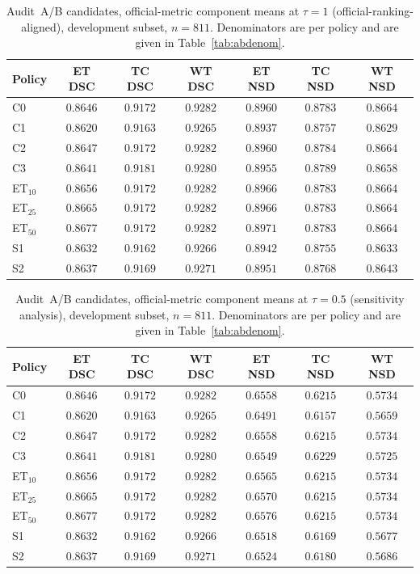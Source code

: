 \documentclass[runningheads]{llncs}
\begin{document}
\begin{table}[!htbp]\centering\small
\caption{Audit~A/B candidates, official-metric component means at $\tau=1$ (official-ranking-aligned), development subset, $n=811$. Denominators are per policy and are given in Table~\ref{tab:abdenom}.}
\begin{tabular}{@{}lcccccc@{}}
\toprule
Policy & ET DSC & TC DSC & WT DSC & ET NSD & TC NSD & WT NSD \\
\midrule
C0 & $0.8646$ & $0.9172$ & $0.9282$ & $0.8960$ & $0.8783$ & $0.8664$ \\
\midrule
C1 & $0.8620$ & $0.9163$ & $0.9265$ & $0.8937$ & $0.8757$ & $0.8629$ \\
C2 & $0.8647$ & $0.9172$ & $0.9282$ & $0.8960$ & $0.8784$ & $0.8664$ \\
C3 & $0.8641$ & $0.9181$ & $0.9280$ & $0.8955$ & $0.8789$ & $0.8658$ \\
ET$_{10}$ & $0.8656$ & $0.9172$ & $0.9282$ & $0.8966$ & $0.8783$ & $0.8664$ \\
ET$_{25}$ & $0.8665$ & $0.9172$ & $0.9282$ & $0.8966$ & $0.8783$ & $0.8664$ \\
ET$_{50}$ & $0.8677$ & $0.9172$ & $0.9282$ & $0.8971$ & $0.8783$ & $0.8664$ \\
S1 & $0.8632$ & $0.9162$ & $0.9266$ & $0.8942$ & $0.8755$ & $0.8633$ \\
S2 & $0.8637$ & $0.9169$ & $0.9271$ & $0.8951$ & $0.8768$ & $0.8643$ \\
\bottomrule
\end{tabular}
\end{table}
\begin{table}[!htbp]\centering\small
\caption{Audit~A/B candidates, official-metric component means at $\tau=0.5$ (sensitivity analysis), development subset, $n=811$. Denominators are per policy and are given in Table~\ref{tab:abdenom}.}
\begin{tabular}{@{}lcccccc@{}}
\toprule
Policy & ET DSC & TC DSC & WT DSC & ET NSD & TC NSD & WT NSD \\
\midrule
C0 & $0.8646$ & $0.9172$ & $0.9282$ & $0.6558$ & $0.6215$ & $0.5734$ \\
\midrule
C1 & $0.8620$ & $0.9163$ & $0.9265$ & $0.6491$ & $0.6157$ & $0.5659$ \\
C2 & $0.8647$ & $0.9172$ & $0.9282$ & $0.6558$ & $0.6215$ & $0.5734$ \\
C3 & $0.8641$ & $0.9181$ & $0.9280$ & $0.6549$ & $0.6229$ & $0.5725$ \\
ET$_{10}$ & $0.8656$ & $0.9172$ & $0.9282$ & $0.6565$ & $0.6215$ & $0.5734$ \\
ET$_{25}$ & $0.8665$ & $0.9172$ & $0.9282$ & $0.6570$ & $0.6215$ & $0.5734$ \\
ET$_{50}$ & $0.8677$ & $0.9172$ & $0.9282$ & $0.6576$ & $0.6215$ & $0.5734$ \\
S1 & $0.8632$ & $0.9162$ & $0.9266$ & $0.6518$ & $0.6169$ & $0.5677$ \\
S2 & $0.8637$ & $0.9169$ & $0.9271$ & $0.6524$ & $0.6180$ & $0.5686$ \\
\bottomrule
\end{tabular}
\end{table}
\end{document}

